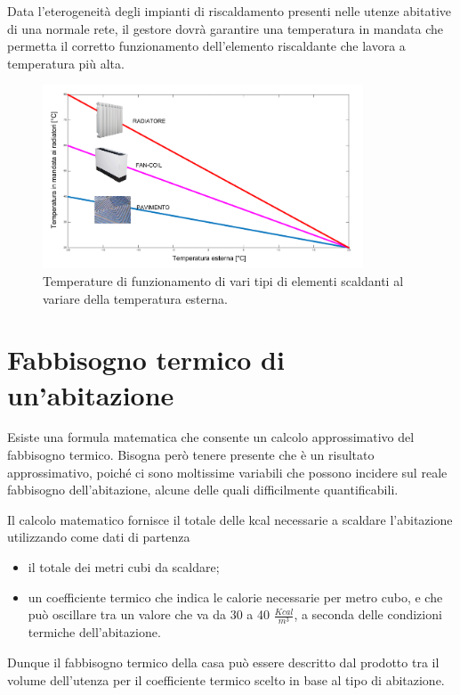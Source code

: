 \documentclass[laurea,oneside,11pt]{USiena_tesiLM3}
\begin{document}
Data l'eterogeneità degli impianti di riscaldamento presenti nelle utenze abitative di una normale rete, il gestore dovrà garantire una temperatura in mandata che permetta il corretto funzionamento dell'elemento riscaldante che lavora a temperatura più alta.

\begin{figure}[!ht]
\centering
\includegraphics[width=0.85\textwidth]{figure/elem_scaldanti} 
\caption{Temperature di funzionamento di vari tipi di elementi scaldanti al variare della temperatura esterna.}
\label{fig:elem_scaldanti}
\end{figure}

\section{Fabbisogno termico di un'abitazione}
Esiste una formula matematica che consente un calcolo approssimativo del fabbisogno termico. Bisogna però tenere presente che è  un risultato approssimativo, poiché ci sono moltissime variabili che possono incidere sul reale fabbisogno dell'abitazione, alcune delle quali difficilmente quantificabili. 

Il calcolo matematico fornisce il totale delle kcal necessarie a scaldare l'abitazione utilizzando come dati di partenza
\begin{itemize}
\item  il totale dei metri cubi da scaldare;
\item  un coefficiente termico che indica le calorie necessarie per metro cubo, e che può  oscillare tra un valore che va da 30 a 40 $\frac{Kcal}{m^3}$, a seconda delle condizioni termiche dell'abitazione.
\end{itemize}
Dunque il fabbisogno termico della casa può essere descritto dal prodotto tra il volume dell'utenza per il coefficiente termico scelto in base al tipo di abitazione.
\end{document}
